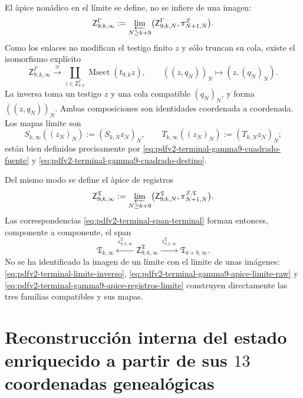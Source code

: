 El \`apice non\'adico en el l\'imite se define, no se infiere de una imagen:
\begin{equation}
\label{eq:pdfv2-terminal-gamma9-apice-limite-raw}
 \mathsf Z^\Gamma_{9;k,\infty}
 :=\varprojlim_{N\geq k+9}
 \bigl(\mathsf Z^\Gamma_{9;k,N},\pi^Z_{N+1,N}\bigr).
\end{equation}
Como los enlaces no modifican el testigo finito \(z\) y s\'olo truncan su
cola, existe el isomorfismo expl\'icito
\begin{equation}
\label{eq:pdfv2-terminal-gamma9-apice-limite-msect}
 \mathsf Z^\Gamma_{9;k,\infty}
 \xrightarrow{\ \cong\ }
 \coprod_{z\in\mathsf Z^\Gamma_{9,k}}
 \operatorname{Msect}(t_{9,k}z),\qquad
 ((z,q_N))_N\longmapsto(z,(q_N)_N).
\end{equation}
La inversa toma un testigo \(z\) y una cola compatible \((q_N)_N\), y forma
\(((z,q_N))_N\). Ambas composiciones son identidades coordenada a
coordenada. Los mapas l\'imite son
\begin{equation}
\label{eq:pdfv2-terminal-gamma9-mapas-limite-raw}
 S_{k,\infty}((z_N)_N):=(S_{k,N}z_N)_N,\qquad
 T_{k,\infty}((z_N)_N):=(T_{k,N}z_N)_N;
\end{equation}
est\'an bien definidos precisamente por
\eqref{eq:pdfv2-terminal-gamma9-cuadrado-fuente} y
\eqref{eq:pdfv2-terminal-gamma9-cuadrado-destino}.

Del mismo modo se define el \`apice de registros
\begin{equation}
\label{eq:pdfv2-terminal-gamma9-apice-registros-limite}
 \mathsf Z^{\mathfrak T}_{9;k,\infty}
 :=\varprojlim_{N\geq k+9}
 \bigl(\mathsf Z^{\mathfrak T}_{9;k,N},
       \pi^{Z,\mathfrak T}_{N+1,N}\bigr).
\end{equation}
Las correspondencias
\eqref{eq:pdfv2-terminal-span-terminal} forman entonces, componente a
componente, el span
\begin{equation}
\label{eq:pdfv2-terminal-span-limite}
 \mathfrak T_{k,\infty}
 \xleftarrow{\ s^{\mathfrak T}_{9;k,\infty}\ }
 \mathsf Z^{\mathfrak T}_{9;k,\infty}
 \xrightarrow{\ t^{\mathfrak T}_{9;k,\infty}\ }
 \mathfrak T_{k+9,\infty}.
\end{equation}
No se ha identificado la imagen de un l\'imite con el l\'imite de unas
im\'agenes: \eqref{eq:pdfv2-terminal-limite-inverso},
\eqref{eq:pdfv2-terminal-gamma9-apice-limite-raw} y
\eqref{eq:pdfv2-terminal-gamma9-apice-registros-limite} construyen
directamente las tres familias compatibles y sus mapas.

\section{Reconstrucción interna del estado enriquecido a partir de sus \(13\) coordenadas genealógicas}

